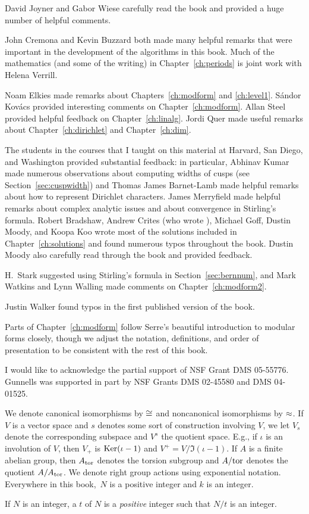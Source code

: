 \vspace{2ex}
David Joyner and Gabor Wiese carefully read the book and provided
a huge number of helpful comments.

John Cremona and Kevin Buzzard both made many helpful remarks that
were important in the development of the algorithms in this
book.  Much of the mathematics (and some of the writing) in
Chapter~\ref{ch:periods} is joint work with Helena Verrill.

Noam Elkies made remarks about Chapters~\ref{ch:modform} and
\ref{ch:level1}.  S\'andor Kov\'acs provided interesting comments on
Chapter~\ref{ch:modform}.  Allan Steel provided helpful feedback on
Chapter~\ref{ch:linalg}.  Jordi Quer made useful remarks
about Chapter~\ref{ch:dirichlet} and Chapter~\ref{ch:dim}.

The students in the courses that I taught on this material at Harvard,
San Diego, and Washington provided substantial feedback: in
particular, Abhinav Kumar made numerous observations about computing
widths of cusps (see Section~\ref{sec:cuspwidth}) and Thomas James
Barnet-Lamb made helpful remarks about 
how to represent Dirichlet characters.  James
Merryfield made helpful remarks about complex analytic issues and
about convergence in Stirling's formula.  Robert Bradshaw, Andrew
Crites (who wrote ), Michael Goff, Dustin
Moody, and Koopa Koo wrote most of the solutions included in
Chapter~\ref{ch:solutions} and found numerous typos throughout the
book.  Dustin Moody also carefully read through the book and provided
feedback.

H.~Stark suggested using Stirling's formula in Section~\ref{sec:bernnum},
and Mark Watkins and Lynn Walling made comments on
Chapter~\ref{ch:modform2}.

Justin Walker found typos in the first published version of the book.

Parts of Chapter~\ref{ch:modform} follow Serre's beautiful
introduction to modular forms \cite[Ch.~VII]{serre:arithmetic}
closely, though we adjust the notation, definitions, and order of
presentation to be consistent with the rest of this book. 

I would like to acknowledge the partial support of 
NSF Grant DMS 05-55776.
Gunnells was supported in part by NSF Grants DMS 02-45580 and
 DMS 04-01525.


\vspace{2ex}
We denote canonical isomorphisms by $\cong$
and noncanonical isomorphisms by $\approx$. 
If $V$ is a vector space and $s$ denotes
some sort of construction involving $V$,
we let $V_s$ denote the corresponding subspace
and $V^s$ the quotient space.  E.g., if $\iota$
is an involution of $V$, then $V_+$ is $\operatorname{Ker}(\iota-1)$
and $V^+ = V/\Im(\iota-1)$.  If $A$ is a finite
abelian group, then $A_{\operatorname{tor}}$ denotes the torsion
subgroup and $A/{\operatorname{tor}}$ denotes the quotient $A/A_{\operatorname{tor}}$.
We denote right group actions using exponential
notation.  Everywhere in this book,~$N$ is a positive
integer and $k$ is an integer. 

If $N$ is an integer, a  $t$ of $N$
is a {\em positive} integer such that $N/t$ is an integer.

